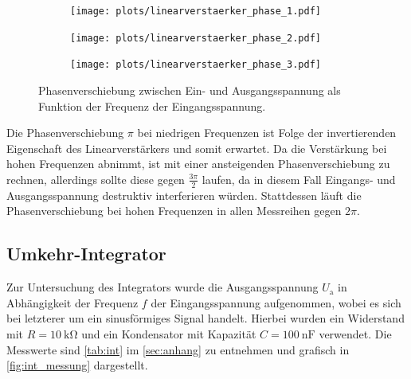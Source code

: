 \begin{figure}[H]
  \centering
  \begin{subfigure}{.65\textwidth}
    \texttt{[image: plots/linearverstaerker\_phase\_1.pdf]}
  \end{subfigure}
  \begin{subfigure}{.65\textwidth}
    \texttt{[image: plots/linearverstaerker\_phase\_2.pdf]}
  \end{subfigure}
  \begin{subfigure}{.65\textwidth}
    \texttt{[image: plots/linearverstaerker\_phase\_3.pdf]}
  \end{subfigure}
  \caption{Phasenverschiebung zwischen Ein- und Ausgangsspannung als Funktion der Frequenz der Eingangsspannung.}
  \label{fig:phase}
\end{figure}
Die Phasenverschiebung $\pi$ bei niedrigen Frequenzen ist Folge der invertierenden Eigenschaft des Linearverstärkers und somit erwartet. Da die Verstärkung bei hohen Frequenzen abnimmt, ist mit einer ansteigenden Phasenverschiebung zu rechnen, allerdings sollte diese gegen $\frac{3\pi}{2}$ laufen, da in diesem Fall Eingangs- und Ausgangsspannung destruktiv interferieren würden. Stattdessen läuft die Phasenverschiebung bei hohen Frequenzen in allen Messreihen gegen $2\pi$.

\subsection{Umkehr-Integrator}
Zur Untersuchung des Integrators wurde die Ausgangsspannung $U_\mathrm{a}$ in Abhängigkeit der Frequenz $f$ der Eingangsspannung aufgenommen, wobei es sich bei letzterer um ein sinusförmiges Signal handelt. Hierbei wurden ein Widerstand mit $R = \SI{10}{\kilo\ohm}$ und ein Kondensator mit Kapazität $C = \SI{100}{\nano\farad}$ verwendet. Die Messwerte sind \autoref{tab:int} im \autoref{sec:anhang} zu entnehmen und grafisch in \autoref{fig:int_messung} dargestellt.

